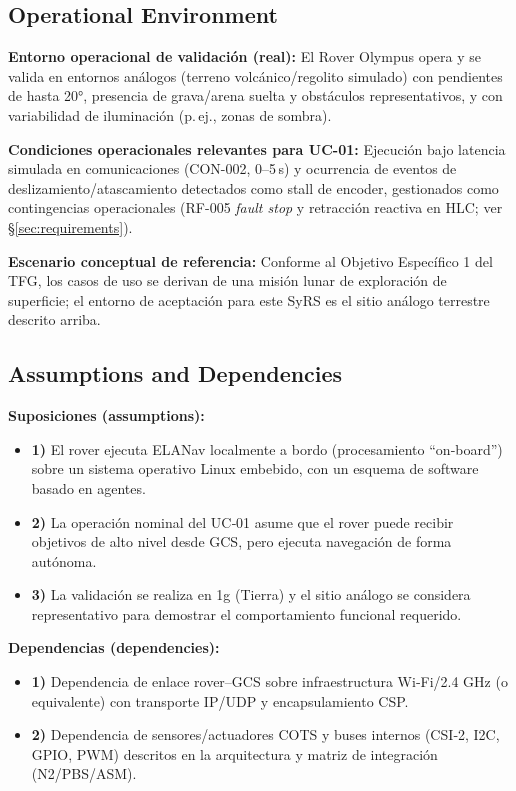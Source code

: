 \subsection{Operational Environment}\label{subsec:operational_environment}

\textbf{Entorno operacional de validación (real):} El Rover Olympus opera y se valida en entornos análogos (terreno volcánico/regolito simulado) con pendientes de hasta 20°, presencia de grava/arena suelta y obstáculos representativos, y con variabilidad de iluminación (p.\,ej., zonas de sombra).

\textbf{Condiciones operacionales relevantes para UC-01:} Ejecución bajo latencia simulada en comunicaciones (CON-002, 0--5\,s) y ocurrencia de eventos de deslizamiento/atascamiento detectados como stall de encoder, gestionados como contingencias operacionales (RF-005 \emph{fault stop} y retracción reactiva en HLC; ver \S\ref{sec:requirements}).

\textbf{Escenario conceptual de referencia:} Conforme al Objetivo Específico 1 del TFG, los casos de uso se derivan de una misión lunar de exploración de superficie; el entorno de aceptación para este SyRS es el sitio análogo terrestre descrito arriba.

\subsection{Assumptions and Dependencies}\label{subsec:assumptions}

\textbf{Suposiciones (assumptions):}
\begin{itemize}
    \item \textbf{1)} El rover ejecuta ELANav localmente a bordo (procesamiento ``on‑board'') sobre un sistema operativo Linux embebido, con un esquema de software basado en agentes.
    \item \textbf{2)} La operación nominal del UC‑01 asume que el rover puede recibir objetivos de alto nivel desde GCS, pero ejecuta navegación de forma autónoma.
    \item \textbf{3)} La validación se realiza en 1g (Tierra) y el sitio análogo se considera representativo para demostrar el comportamiento funcional requerido.
\end{itemize}

\textbf{Dependencias (dependencies):}
\begin{itemize}
    \item \textbf{1)} Dependencia de enlace rover–GCS sobre infraestructura Wi‑Fi/2.4 GHz (o equivalente) con transporte IP/UDP y encapsulamiento CSP.
    \item \textbf{2)} Dependencia de sensores/actuadores COTS y buses internos (CSI‑2, I2C, GPIO, PWM) descritos en la arquitectura y matriz de integración (N2/PBS/ASM).
\end{itemize}

